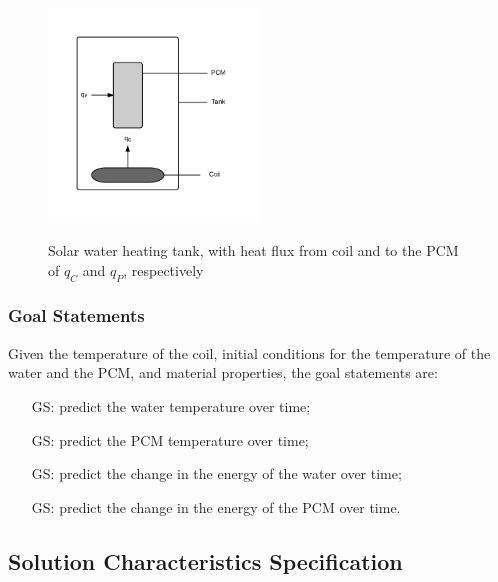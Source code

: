 \documentclass[12pt]{article}
\newcounter{goalnum} %
\begin{document}
\begin{figure}[h!]
\begin{center}
{
 \includegraphics[width=0.5\textwidth]{Tank.png}
}
\caption{\label{Fig_Tank} Solar water heating tank, with heat flux from coil 
and to the PCM of $q_C$ and $q_P$, respectively}
\end{center}
\end{figure}

\subsubsection{Goal Statements}

\noindent Given the temperature of the coil, initial conditions for the temperature of 
the water and the PCM, and material properties, the goal statements are:

\begin{itemize}

\item[GS\refstepcounter{goalnum}\thegoalnum \label{G_wtemp}:] predict the water 
temperature over time;

\item[GS\refstepcounter{goalnum}\thegoalnum \label{G_ptemp}:] predict the PCM 
temperature over time;
	
\item[GS\refstepcounter{goalnum}\thegoalnum \label{G_wenergy}:] predict the 
change in the energy of the
  water over time;

\item[GS\refstepcounter{goalnum}\thegoalnum \label{G_penergy}:] predict the 
change in the energy of the PCM over time.

\end{itemize}

\subsection{Solution Characteristics Specification}
\end{document}
